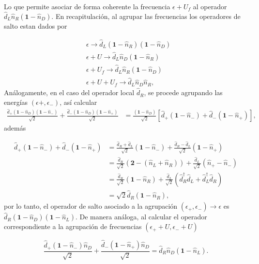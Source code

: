 \begin{appendixs}
Lo que permite asociar de forma coherente la frecuencia $\epsilon + U_{f}$ al operador $\hat{d}_{L}\hat{n}_{R}(\mathbf{1}-\hat{n}_{D})$. En recapitulación, al agrupar las frecuencias los operadores de salto estan dados por 

\begin{align*}
    &\epsilon \to \hat{d}_{L}(\textbf{1}-\hat{n}_{R})(\textbf{1}-\hat{n}_{D})\\
   &\epsilon + U \to \hat{d}_{L}\hat{n}_{D}(\textbf{1}-\hat{n}_{R})\\
    &\epsilon +U_{f}\to \hat{d}_{L}\hat{n}_{R}(\textbf{1}-\hat{n}_{D})\\
    &\epsilon +U+U_{f}\to \hat{d}_{L}\hat{n}_{D}\hat{n}_{R},
\end{align*}
Análogamente, en el caso del operador local $\hat{d}_{R}$, se procede agrupando las energías $(\epsilon{+}, \epsilon_{-})$, así calcular  
\begin{align*}
    \frac{\hat{d}_{+}(\textbf{1}-\hat{n}_{D})(\textbf{1}-\hat{n}_{-}) }{\sqrt{2}} + \frac{\hat{d}_{-}(\textbf{1}-\hat{n}_{D})(\textbf{1}-\hat{n}_{+}) }{\sqrt{2}} & = \frac{(\textbf{1} - \hat{n}_{D})}{\sqrt{2}}[\hat{d}_{+}(\textbf{1}-\hat{n}_{-}) + \hat{d}_{-}(\textbf{1}-\hat{n}_{+})],
\end{align*}
además  

\begin{align*}
    \hat{d}_{+}(\textbf{1}-\hat{n}_{-}) + \hat{d}_{-}(\textbf{1}-\hat{n}_{+}) & =  \frac{\hat{d}_{R} + \hat{d}_{L}}{\sqrt{2}}(\textbf{1} - \hat{n}_{-}) + \frac{\hat{d}_{R} - \hat{d}_{L}}{\sqrt{2}}(\textbf{1} - \hat{n}_{+})   \\
    & = \frac{\hat{d}_{R}}{\sqrt{2}}(\textbf{2} - (\hat{n}_{L} + \hat{n}_{R})) + \frac{\hat{d}_{L}}{\sqrt{2}} (\hat{n}_{+}-\hat{n}_{-}) \\
    & = \frac{\hat{d}_{R}}{\sqrt{2}}(\textbf{1} -  \hat{n}_{R}) + \frac{\hat{d}_{L}}{\sqrt{2}} (\hat{d}^{\dagger}_{R}\hat{d}_{L} + \hat{d}^{\dagger}_{L}\hat{d}_{R}) \\
    & = \sqrt{2}\hat{d}_{R}(\textbf{1}-\hat{n}_{R}),
\end{align*}
por lo tanto, el operador de salto asociado a la agrupación $(\epsilon_{+},\epsilon_{-}) \to \epsilon$ es $\hat{d}_{R}(\textbf{1} - \hat{n}_{D})(\textbf{1} - \hat{n}_{L})$. De manera análoga, al calcular el operador correspondiente a la agrupación de frecuencias $(\epsilon_{+}+U, \epsilon_{-}+U)$

\begin{equation*}
    \frac{\hat{d}_{+}(\textbf{1}-\hat{n}_{-})\hat{n}_{D}}{\sqrt{2}} + \frac{\hat{d}_{-}(\textbf{1}-\hat{n}_{+})\hat{n}_{D}}{\sqrt{2}}  = \hat{d}_{R}\hat{n}_{D}(\textbf{1}-\hat{n}_{L}).
\end{equation*}


\end{appendixs}
